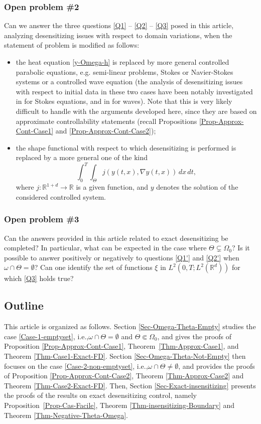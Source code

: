 \documentclass[11pt]{article}
\newcommand{\ie}{i.e.,\xspace}
\numberwithin{equation}{section}
\newcounter{question}
\newcommand\R{{\mathbb R}}
\theoremstyle{definition}
\begin{document}
\subsubsection*{Open problem \#{2}} Can we answer the three questions {\ref{Q1} -- \ref{Q2} -- \ref{Q3}} posed in this article, analyzing desensitizing issues with respect to domain variations, when the statement of problem is modified as follows:
\begin{itemize}
\item the heat equation \eqref{y-Omega-h} is replaced by more general controlled parabolic equations, e.g. semi-linear problems, Stokes or Navier-Stokes systems or a controlled wave equation (the analysis of desensitizing issues with respect to initial data in these two cases have been notably investigated in \cite{Guerrero} for Stokes equations, and in \cite{Tebou1,Tebou2,Alabau-Boussouira} for waves). Note that this is very likely difficult to handle with the arguments deve\-loped here, since they are based on approximate controllability statements (recall Propositions \ref{Prop-Approx-Cont-Case1} and \ref{Prop-Approx-Cont-Case2});

\item the shape functional with respect to which desensitizing is performed is replaced by a more general one of the kind
\[
\int_0^T\int_{\Theta}j(y(t,x),\nabla y(t,x))\, dx\,dt,
\]
where $j:\R^{1+d} \to \R$ is a given function, and $y$ denotes the solution of the considered controlled system.
\end{itemize}

\subsubsection*{Open problem \#{3}} Can the answers provided in this article related to exact desensitizing be completed? In particular, what can be expected in the case where $\Theta \subsetneq \Omega_0$? Is it possible to answer positively or negatively to questions \ref{Q1'} and \ref{Q2'} when $\omega \cap \Theta= \emptyset$? Can one identify the set of functions $\xi$ in $L^2(0,T; L^2(\R^d))$ for which \ref{Q3} holds true?

\subsection{Outline}

This article is organized as follows. Section \ref{Sec-Omega-Theta-Empty} studies the case \eqref{Case-1-emptyset}, \ie $\omega \cap \Theta = \emptyset$ and $\Theta \Subset \Omega_0$, and gives the proofs of Proposition \ref{Prop-Approx-Cont-Case1}, Theorem~\ref{Thm-Approx-Case1}, and Theorem \ref{Thm-Case1-Exact-FD}. Section \ref{Sec-Omega-Theta-Not-Empty} then focuses on the case \eqref{Case-2-non-emptyset}, \ie $\omega \cap \Theta \neq \emptyset$, and provides the proofs of Proposition \ref{Prop-Approx-Cont-Case2}, Theorem \ref{Thm-Approx-Case2} and Theorem \ref{Thm-Case2-Exact-FD}. Then, Section \ref{Sec-Exact-insensitizing} presents the proofs of the results on exact desensitizing control, namely Proposition~\ref{Prop-Cas-Facile}, Theorem \ref{Thm-insensitizing-Boundary} and Theorem \ref{Thm-Negative-Theta-Omega}.
\end{document}

